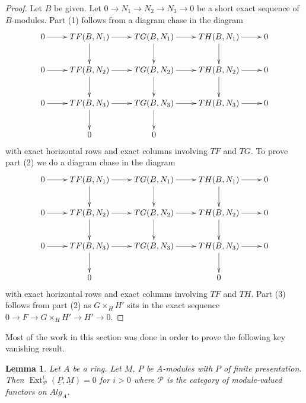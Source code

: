 \documentclass{stacks-project}
\theoremstyle{plain}
\newtheorem{lemma}[subsection]{Lemma}
\theoremstyle{definition}
\theoremstyle{remark}
\numberwithin{equation}{subsection}
\def\Ext{\mathop{\mathrm{Ext}}\nolimits}
\begin{document}
\begin{proof}
Let $B$ be given. Let $0 \to N_1 \to N_2 \to N_3 \to 0$ be a short exact
sequence of $B$-modules. Part (1) follows from a diagram chase in
the diagram
$$
\xymatrix{
0 \ar[r] &
TF(B, N_1) \ar[r] \ar[d] &
TG(B, N_1) \ar[r] \ar[d] &
TH(B, N_1) \ar[r] \ar[d] & 0 \\
0 \ar[r] &
TF(B, N_2) \ar[r] \ar[d] &
TG(B, N_2) \ar[r] \ar[d] &
TH(B, N_2) \ar[r] \ar[d] & 0 \\
0 \ar[r] &
TF(B, N_3) \ar[r] \ar[d] &
TG(B, N_3) \ar[r] \ar[d] &
TH(B, N_3) \ar[r] & 0 \\
& 0 & 0
}
$$
with exact horizontal rows and exact columns involving $TF$ and $TG$.
To prove part (2) we do a diagram chase in the diagram
$$
\xymatrix{
0 \ar[r] &
TF(B, N_1) \ar[r] \ar[d] &
TG(B, N_1) \ar[r] \ar[d] &
TH(B, N_1) \ar[r] \ar[d] & 0 \\
0 \ar[r] &
TF(B, N_2) \ar[r] \ar[d] &
TG(B, N_2) \ar[r] \ar[d] &
TH(B, N_2) \ar[r] \ar[d] & 0 \\
0 \ar[r] &
TF(B, N_3) \ar[r] \ar[d] &
TG(B, N_3) \ar[r] &
TH(B, N_3) \ar[r] \ar[d] & 0 \\
& 0 & & 0
}
$$
with exact horizontal rows and exact columns involving $TF$ and $TH$.
Part (3) follows from part (2) as $G \times_H H'$ sits in the exact
sequence $0 \to F \to G \times_H H' \to H' \to 0$.
\end{proof}

\noindent
Most of the work in this section was done in order to prove the
following key vanishing result.

\begin{lemma}
\label{lemma-ext-group-zero-key}
Let $A$ be a ring. Let $M$, $P$ be $A$-modules with $P$ of finite
presentation. Then
$\Ext^i_\mathcal{P}(\underline{P}, \underline{M}) = 0$
for $i > 0$ where $\mathcal{P}$ is the category of module-valued
functors on $\textit{Alg}_A$.
\end{lemma}
\end{document}

